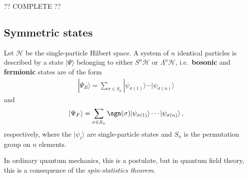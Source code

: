     ?? COMPLETE ??

\subsection{Symmetric states}

    \begin{axiom}
        Let $\mathcal{H}$ be the single-particle Hilbert space. A system of $n$ identical particles is described by a state $|\Psi\rangle$ belonging to either $S^n\mathcal{H}$ or $\Lambda^n\mathcal{H}$, i.e.~\textbf{bosonic} and \textbf{fermionic} states are of the form
        \begin{gather}
            |\Psi_B\rangle = \sum_{\sigma\in S_n}|\psi_{\sigma(1)}\rangle\cdots|\psi_{\sigma(n)}\rangle
        \end{gather}
        and
        \begin{gather}
            |\Psi_F\rangle = \sum_{\sigma\in S_n}\sgn(\sigma)|\psi_{\sigma(1)}\rangle\cdots|\psi_{\sigma(n)}\rangle\,,
        \end{gather}
        respectively, where the $|\psi_i\rangle$ are single-particle states and $S_n$ is the permutation group on $n$ elements.
    \end{axiom}
    \begin{remark}
        In ordinary quantum mechanics, this is a postulate, but in quantum field theory, this is a consequence of the \textit{spin-statistics theorem}.
    \end{remark}


